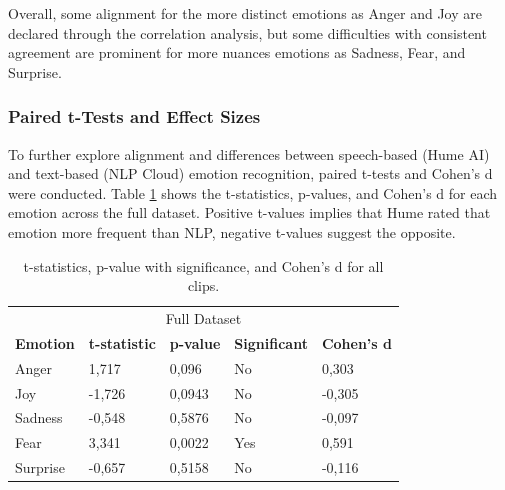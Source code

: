 Overall, some alignment for the more distinct emotions as Anger and Joy are declared through the correlation analysis, but some difficulties with consistent agreement are prominent for more nuances emotions as Sadness, Fear, and Surprise. 

\subsubsection{Paired t-Tests and Effect Sizes}
To further explore alignment and differences between speech-based (Hume AI) and text-based (NLP Cloud) emotion recognition, paired t-tests and Cohen's d were conducted. 
Table \ref{tab:t-test-all} shows the t-statistics, p-values, and Cohen's d for each emotion across the full dataset. Positive t-values implies that Hume rated that emotion more frequent than NLP, negative t-values suggest the opposite.
\begin{table}[!h]
    \centering
    \begin{tabular}{lllll}
    \multicolumn{5}{c}{\cellcolor[HTML]{C0C0C0}Full Dataset}                                                                                                                                                    \\
    \multicolumn{1}{c|}{\textbf{Emotion}} & \multicolumn{1}{c}{\textbf{t-statistic}} & \multicolumn{1}{c}{\textbf{p-value}} & \multicolumn{1}{c}{\textbf{Significant}} & \multicolumn{1}{c}{\textbf{Cohen's d}} \\ \hline
    \multicolumn{1}{l|}{Anger}            & 1,717                                    & 0,096                                & No                                       & 0,303                                  \\
    \multicolumn{1}{l|}{Joy}              & -1,726                                   & 0,0943                               & No                                       & -0,305                                 \\
    \multicolumn{1}{l|}{Sadness}          & -0,548                                   & 0,5876                               & No                                       & -0,097                                 \\
    \multicolumn{1}{l|}{Fear}             & 3,341                                    & 0,0022                               & Yes                                      & 0,591                                  \\
    \multicolumn{1}{l|}{Surprise}         & -0,657                                   & 0,5158                               & No                                       & -0,116                                
    \end{tabular}
    \caption{t-statistics, p-value with significance, and Cohen's d for all clips.}
    \label{tab:t-test-all}
\end{table}

